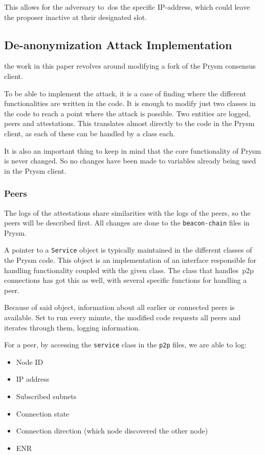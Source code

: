 This allows for the adversary to~\gls{dos} the specific IP-address,
which could leave the proposer inactive at their designated slot.

\subsection{De-anonymization Attack Implementation}\label{subsec:attack-implementation}
the work in this paper revolves around modifying a fork of the Prysm consensus client.

To be able to implement the attack,
it is a case of finding where the different functionalities are written in the code.
It is enough to modify just two classes in the code to reach a point where the attack is possible.
Two entities are logged, peers and attestations.
This translates almost directly to the code in the Prysm client, as each of these can be handled by a class each.

It is also an important thing to keep in mind that the core functionality of Prysm is never changed.
So no changes have been made to variables already being used in the Prysm client.




\subsubsection{Peers}\label{subsubsec:peers}
The logs of the attestations share similarities with the logs of the peers, so the peers will be described first.
All changes are done to the \texttt{beacon-chain} files in Prysm.

A pointer to a \texttt{Service} object is typically maintained in the different classes of the Prysm code.
This object is an implementation of an interface responsible for handling functionality coupled with the given class.
The class that handles~\gls{p2p} connections has got this as well, with several specific functions for handling a peer.

Because of said object, information about all earlier or connected peers is available.
Set to run every minute, the modified code requests all peers and iterates through them,
logging information.

For a peer, by accessing the \texttt{service} class in the \texttt{p2p} files, we are able to log:
\begin{itemize}
     \item Node ID
     \item IP address
     \item Subscribed subnets
     \item Connection state
     \item Connection direction (which node discovered the other node)
     \item ENR
\end{itemize}


